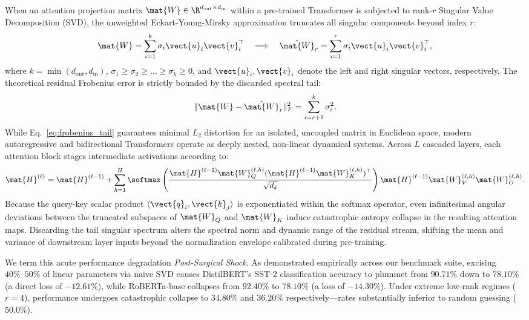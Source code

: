 When an attention projection matrix $\mat{W} \in \R^{d_{\text{out}} \times d_{\text{in}}}$ within a pre-trained Transformer is subjected to rank-$r$ Singular Value Decomposition (SVD), the unweighted Eckart-Young-Mirsky approximation truncates all singular components beyond index $r$:
\begin{equation}
\mat{W} = \sum_{i=1}^k \sigma_i \vect{u}_i \vect{v}_i^\top \quad \Longrightarrow \quad \hat{\mat{W}}_r = \sum_{i=1}^r \sigma_i \vect{u}_i \vect{v}_i^\top,
\label{eq:svd_truncation}
\end{equation}
where $k = \min(d_{\text{out}}, d_{\text{in}})$, $\sigma_1 \ge \sigma_2 \ge \dots \ge \sigma_k \ge 0$, and $\vect{u}_i, \vect{v}_i$ denote the left and right singular vectors, respectively. The theoretical residual Frobenius error is strictly bounded by the discarded spectral tail:
\begin{equation}
\|\mat{W} - \hat{\mat{W}}_r\|_F^2 = \sum_{i=r+1}^k \sigma_i^2.
\label{eq:frobenius_tail}
\end{equation}
While Eq.~\eqref{eq:frobenius_tail} guarantees minimal $L_2$ distortion for an isolated, uncoupled matrix in Euclidean space, modern autoregressive and bidirectional Transformers operate as deeply nested, non-linear dynamical systems. Across $L$ cascaded layers, each attention block stages intermediate activations according to:
\begin{equation}
\mat{H}^{(\ell)} = \mat{H}^{(\ell-1)} + \sum_{h=1}^H \softmax\left(\frac{\mat{H}^{(\ell-1)}\mat{W}_Q^{(\ell, h)} (\mat{H}^{(\ell-1)}\mat{W}_K^{(\ell, h)})^\top}{\sqrt{d_k}}\right) \mat{H}^{(\ell-1)}\mat{W}_V^{(\ell, h)} \mat{W}_O^{(\ell, h)}.
\label{eq:transformer_forward_recurrence}
\end{equation}
Because the query-key scalar product $\langle \vect{q}_i, \vect{k}_j \rangle$ is exponentiated within the softmax operator, even infinitesimal angular deviations between the truncated subspaces of $\mat{W}_Q$ and $\mat{W}_K$ induce catastrophic entropy collapse in the resulting attention maps. Discarding the tail singular spectrum alters the spectral norm and dynamic range of the residual stream, shifting the mean and variance of downstream layer inputs beyond the normalization envelope calibrated during pre-training.

We term this acute performance degradation \emph{Post-Surgical Shock}. As demonstrated empirically across our benchmark suite, excising $40\%\text{--}50\%$ of linear parameters via naive SVD causes DistilBERT's SST-2 classification accuracy to plummet from $90.71\%$ down to $78.10\%$ (a direct loss of $-12.61\%$), while RoBERTa-base collapses from $92.40\%$ to $78.10\%$ (a loss of $-14.30\%$). Under extreme low-rank regimes ($r=4$), performance undergoes catastrophic collapse to $34.80\%$ and $36.20\%$ respectively---rates substantially inferior to random guessing ($50.0\%$).

